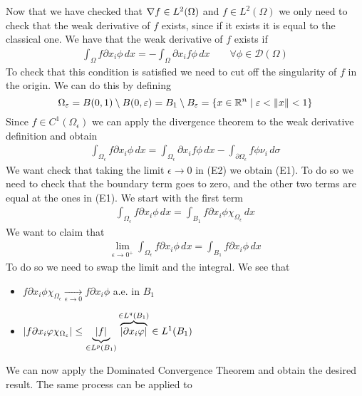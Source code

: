 Now that we have checked that \(\nabla f \in L^2(\Omega)\) and \(f \in L^2(\Omega)\) we only need to check that the weak derivative of \(f\) exists, since if it exists it is equal to the classical one. We have that the weak derivative of \(f\) exists if
\[
    \begin{split}
        \int_\Omega f \partial x_i \phi \, dx = - \int_\Omega \partial x_i f \phi \, dx \qquad \forall \phi \in \mathcal{D}(\Omega)
    \end{split}
    \tag*{E1}
\]
To check that this condition is satisfied we need to cut off the singularity of \(f\) in the origin. We can do this by defining
\[
    \Omega_\varepsilon = B(0, 1) \setminus B(0, \varepsilon) = B_1 \setminus B_\varepsilon = \left\{ x \in \mathbb{R}^n \mid \varepsilon < \norm{x} < 1 \right\}
\]
Since \(f \in C^1(\Omega_\epsilon)\) we can apply the divergence theorem to the weak derivative definition and obtain
\[
    \begin{split}
        \int_{\Omega_\epsilon} f \partial x_i \phi \, dx = \int_{\Omega_\epsilon} \partial x_i f \phi \, dx - \int_{\partial\Omega_\epsilon} f \phi \nu_i \, d\sigma
    \end{split}
    \tag*{E2}
\]
We want check that taking the limit \(\epsilon \to 0\) in (E2) we obtain (E1). To do so we need to check that the boundary term goes to zero, and the other two terms are equal at the ones in (E1). We start with the first term
\[
    \begin{split}
        \int_{\Omega_\epsilon} f \partial x_i \phi \, dx = \int_{B_1} f \partial x_i \phi \chi_{\Omega_\epsilon} \, dx
    \end{split}
\]
We want to claim that 
\[
    \begin{split}
        \lim_{\epsilon \to 0^+} \int_{\Omega_\epsilon} f \partial x_i \phi \, dx = \int_{B_1} f \partial x_i \phi \, dx
    \end{split}
\]
To do so we need to swap the limit and the integral. We see that 
\begin{itemize}
    \item \(f \partial x_i \phi \chi_{\Omega_\epsilon} \underset{\epsilon \to 0}{\longrightarrow} f \partial x_i \phi\) a.e. in \(B_1\)
    \item \(\abs{f \partial x_i \varphi \chi_{\Omega_\varepsilon}} \leq \underbrace{\abs{f}}_{\in L^p(B_1)} \overbrace{\abs{\partial x_i \varphi}}^{\in L^q(B_1)} \in L^1(B_1)\)
\end{itemize}
We can now apply the Dominated Convergence Theorem and obtain the desired result. 
The same process can be applied to
